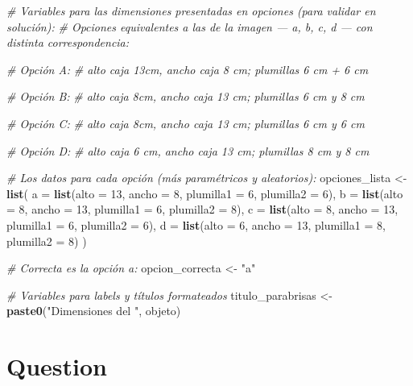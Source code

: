 \documentclass[
]{article}
\newenvironment{Shaded}{\begin{snugshade}}{\end{snugshade}}
\newcommand{\AttributeTok}[1]{\textcolor[rgb]{0.13,0.29,0.53}{#1}}
\newcommand{\CommentTok}[1]{\textcolor[rgb]{0.56,0.35,0.01}{\textit{#1}}}
\newcommand{\DecValTok}[1]{\textcolor[rgb]{0.00,0.00,0.81}{#1}}
\newcommand{\FunctionTok}[1]{\textcolor[rgb]{0.13,0.29,0.53}{\textbf{#1}}}
\newcommand{\NormalTok}[1]{#1}
\newcommand{\OtherTok}[1]{\textcolor[rgb]{0.56,0.35,0.01}{#1}}
\newcommand{\StringTok}[1]{\textcolor[rgb]{0.31,0.60,0.02}{#1}}
\begin{document}
\begin{Shaded}
\begin{Highlighting}[]
\CommentTok{\# Variables para las dimensiones presentadas en opciones (para validar en solución):}
\CommentTok{\# Opciones equivalentes a las de la imagen — a, b, c, d — con distinta correspondencia:}

\CommentTok{\# Opción A:}
\CommentTok{\# alto caja 13cm, ancho caja 8 cm; plumillas 6 cm + 6 cm}

\CommentTok{\# Opción B:}
\CommentTok{\# alto caja 8cm, ancho caja 13 cm; plumillas 6 cm y 8 cm}

\CommentTok{\# Opción C:}
\CommentTok{\# alto caja 8cm, ancho caja 13 cm; plumillas 6 cm y 6 cm}

\CommentTok{\# Opción D:}
\CommentTok{\# alto caja 6 cm, ancho caja 13 cm; plumillas 8 cm y 8 cm}

\CommentTok{\# Los datos para cada opción (más paramétricos y aleatorios):}
\NormalTok{opciones\_lista }\OtherTok{\textless{}{-}} \FunctionTok{list}\NormalTok{(}
  \AttributeTok{a =} \FunctionTok{list}\NormalTok{(}\AttributeTok{alto =} \DecValTok{13}\NormalTok{, }\AttributeTok{ancho =} \DecValTok{8}\NormalTok{, }\AttributeTok{plumilla1 =} \DecValTok{6}\NormalTok{, }\AttributeTok{plumilla2 =} \DecValTok{6}\NormalTok{),}
  \AttributeTok{b =} \FunctionTok{list}\NormalTok{(}\AttributeTok{alto =} \DecValTok{8}\NormalTok{, }\AttributeTok{ancho =} \DecValTok{13}\NormalTok{, }\AttributeTok{plumilla1 =} \DecValTok{6}\NormalTok{, }\AttributeTok{plumilla2 =} \DecValTok{8}\NormalTok{),}
  \AttributeTok{c =} \FunctionTok{list}\NormalTok{(}\AttributeTok{alto =} \DecValTok{8}\NormalTok{, }\AttributeTok{ancho =} \DecValTok{13}\NormalTok{, }\AttributeTok{plumilla1 =} \DecValTok{6}\NormalTok{, }\AttributeTok{plumilla2 =} \DecValTok{6}\NormalTok{),}
  \AttributeTok{d =} \FunctionTok{list}\NormalTok{(}\AttributeTok{alto =} \DecValTok{6}\NormalTok{, }\AttributeTok{ancho =} \DecValTok{13}\NormalTok{, }\AttributeTok{plumilla1 =} \DecValTok{8}\NormalTok{, }\AttributeTok{plumilla2 =} \DecValTok{8}\NormalTok{)}
\NormalTok{)}

\CommentTok{\# Correcta es la opción a:}
\NormalTok{opcion\_correcta }\OtherTok{\textless{}{-}} \StringTok{"a"}

\CommentTok{\# Variables para labels y títulos formateados}
\NormalTok{titulo\_parabrisas }\OtherTok{\textless{}{-}} \FunctionTok{paste0}\NormalTok{(}\StringTok{"Dimensiones del "}\NormalTok{, objeto)}
\end{Highlighting}
\end{Shaded}

\section{Question}\label{question}
\end{document}
